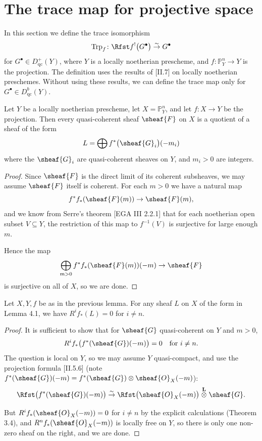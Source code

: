 \setcounter{page}{154}
\section{The trace map for projective space}

In this section we define the trace isomorphism 
\[
\operatorname{Trp}_f\colon \Rfst f^!\bigl(G^\bullet\bigr) \stackrel{\sim}{\to} G^\bullet
\]
for \(G^\bullet \in D_{\mathrm{qc}}^+(Y)\), where \(Y\) is a locally noetherian prescheme, and \(f\colon \mathbb{P}_{Y}^{n} \to Y\) is the projection. The definition uses the results of [II.7] on locally noetherian preschemes. Without using these results, we can define the trace map only for \(G^\bullet \in D_{\mathrm{qc}}^b(Y)\).

\begin{lemma}
Let \(Y\) be a locally noetherian prescheme, let \(X=\mathbb{P}_{Y}^{n}\), and let \(f\colon X \to Y\) be the projection. Then every quasi-coherent sheaf \(\sheaf{F}\) on \(X\) is a quotient of a sheaf of the form
\[
L=\bigoplus f^*\bigl(\sheaf{G}_i\bigr)(-m_i)
\]
where the \(\sheaf{G}_i\) are quasi-coherent sheaves on \(Y\), and \(m_i>0\) are integers.
\end{lemma}

\begin{proof}
Since \(\sheaf{F}\) is the direct limit of its coherent subsheaves, we may assume \(\sheaf{F}\) itself is coherent. For each \(m>0\) we have a natural map
\[
f^* f_*(\sheaf{F}(m)) \to \sheaf{F}(m),
\]
and we know from Serre's theorem [EGA III 2.2.1] that for each noetherian open subset \(V \subseteq Y\), the restriction of this map to \(f^{-1}(V)\) is surjective for large enough \(m\).

Hence the map
\[
\bigoplus_{m>0} f^* f_*(\sheaf{F}(m))(-m) \to \sheaf{F}
\]
is surjective on all of \(X\), so we are done.
\end{proof}

\setcounter{page}{155}
\begin{lemma}
Let \(X,Y,f\) be as in the previous lemma. For any sheaf \(L\) on \(X\) of the form in Lemma 4.1, we have \(R^i f_*(L)=0\) for \(i \neq n\).
\end{lemma}

\begin{proof}
It is sufficient to show that for \(\sheaf{G}\) quasi-coherent on \(Y\) and \(m>0\),
\[
R^i f_*\bigl(f^*(\sheaf{G})(-m)\bigr)=0 \quad \text{for } i \neq n.
\]
The question is local on \(Y\), so we may assume \(Y\) quasi-compact, and use the projection formula [II.5.6] (note \(f^*(\sheaf{G})(-m)=f^*(\sheaf{G}) \otimes \sheaf{O}_X(-m)\)):
\[
\Rfst\bigl(f^*(\sheaf{G})(-m)\bigr) 
\stackrel{\sim}{\to} \Rfst\bigl(\sheaf{O}_X(-m)\bigr) \stackrel{\mathbf{L}}{\otimes} \sheaf{G}.
\]

But \(R^i f_*(\sheaf{O}_X(-m))=0\) for \(i \neq n\) by the explicit calculations (Theorem 3.4), and \(R^n f_*(\sheaf{O}_X(-m))\) is locally free on \(Y\), so there is only one non-zero sheaf on the right, and we are done.
\end{proof}


